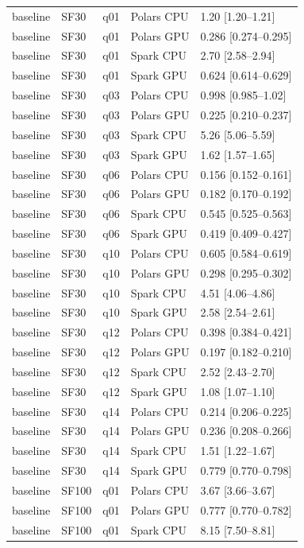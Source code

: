 \begin{longtable}{lllll}
baseline & SF30 & q01 & Polars CPU & 1.20 [1.20--1.21] \\
baseline & SF30 & q01 & Polars GPU & 0.286 [0.274--0.295] \\
baseline & SF30 & q01 & Spark CPU & 2.70 [2.58--2.94] \\
baseline & SF30 & q01 & Spark GPU & 0.624 [0.614--0.629] \\
baseline & SF30 & q03 & Polars CPU & 0.998 [0.985--1.02] \\
baseline & SF30 & q03 & Polars GPU & 0.225 [0.210--0.237] \\
baseline & SF30 & q03 & Spark CPU & 5.26 [5.06--5.59] \\
baseline & SF30 & q03 & Spark GPU & 1.62 [1.57--1.65] \\
baseline & SF30 & q06 & Polars CPU & 0.156 [0.152--0.161] \\
baseline & SF30 & q06 & Polars GPU & 0.182 [0.170--0.192] \\
baseline & SF30 & q06 & Spark CPU & 0.545 [0.525--0.563] \\
baseline & SF30 & q06 & Spark GPU & 0.419 [0.409--0.427] \\
baseline & SF30 & q10 & Polars CPU & 0.605 [0.584--0.619] \\
baseline & SF30 & q10 & Polars GPU & 0.298 [0.295--0.302] \\
baseline & SF30 & q10 & Spark CPU & 4.51 [4.06--4.86] \\
baseline & SF30 & q10 & Spark GPU & 2.58 [2.54--2.61] \\
baseline & SF30 & q12 & Polars CPU & 0.398 [0.384--0.421] \\
baseline & SF30 & q12 & Polars GPU & 0.197 [0.182--0.210] \\
baseline & SF30 & q12 & Spark CPU & 2.52 [2.43--2.70] \\
baseline & SF30 & q12 & Spark GPU & 1.08 [1.07--1.10] \\
baseline & SF30 & q14 & Polars CPU & 0.214 [0.206--0.225] \\
baseline & SF30 & q14 & Polars GPU & 0.236 [0.208--0.266] \\
baseline & SF30 & q14 & Spark CPU & 1.51 [1.22--1.67] \\
baseline & SF30 & q14 & Spark GPU & 0.779 [0.770--0.798] \\
baseline & SF100 & q01 & Polars CPU & 3.67 [3.66--3.67] \\
baseline & SF100 & q01 & Polars GPU & 0.777 [0.770--0.782] \\
baseline & SF100 & q01 & Spark CPU & 8.15 [7.50--8.81] \\

\end{longtable}
